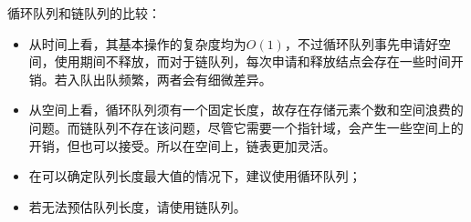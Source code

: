 \begin{frame}
  
\end{frame}

\begin{frame}\ft{\subsecname}
循环队列和链队列的比较：

\begin{itemize}
\item 从时间上看，其基本操作的复杂度均为$O(1)$，不过循环队列事先申请好空间，使用期间不释放，而对于链队列，每次申请和释放结点会存在一些时间开销。若入队出队频繁，两者会有细微差异。\\[0.1in]
\item 从空间上看，循环队列须有一个固定长度，故存在存储元素个数和空间浪费的问题。而链队列不存在该问题，尽管它需要一个指针域，会产生一些空间上的开销，但也可以接受。所以在空间上，链表更加灵活。
\end{itemize}
\end{frame}

\begin{frame}\ft{\subsecname}
\begin{itemize}
\item 在可以确定队列长度最大值的情况下，建议使用循环队列；\\[0.1in]
\item 若无法预估队列长度，请使用链队列。
\end{itemize}
\end{frame}






